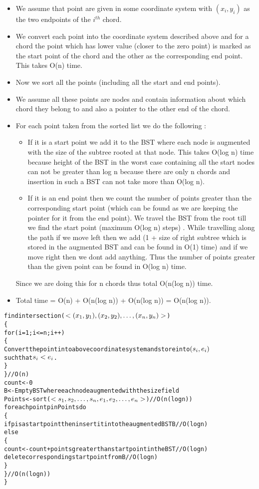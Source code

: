 \documentclass{article}
\begin{document}
\begin{itemize}
\item We assume that point are given in some coordinate system with $(x_i,y_i)$ as the two endpoints of the $i^{th}$ chord.
\item We convert each point into the coordinate system described above and for a chord the point which has lower value (closer to the zero point) is marked as the start point of the chord and the other as the corresponding end point.
This takes O(n) time.
\item Now we sort all the points (including all the start and end points).
\item We assume all these points are nodes and contain information about which chord they belong to and also a pointer to the other end of the chord. 
\item For each point taken from the sorted list we do the following :
	\begin{itemize}
	\item If it is a start point we add it to the BST where each node is augmented with the size of the subtree rooted at that node. This takes O(log n) time because height of the BST in the worst case containing all the start nodes can not be greater than log n because there are only n chords and insertion in such a BST can not take more than O(log n).
	\item If it is an end point then we count the number of points greater than the corresponding start point (which can be found as we are keeping the pointer for it from the end point). We travel the BST from the root till we find the start point (maximum O(log n) steps) . While travelling along the path if we move left then we add (1 + size of right subtree which is stored in the augmented BST and can be found in O(1) time) and if we move right then we dont add anything. Thus the number of points greater than the given point can be found in O(log n) time. 
	\end{itemize}
	Since we are doing this for n chords thus total O(n(log n)) time. 
\item Total time = O(n) + O(n(log n)) + O(n(log n)) = O(n(log n)).
\end{itemize}
\begin{alltt}
findintersection(\(<(x\sb1,y\sb1),(x\sb2,y\sb2),\ldots ,(x\sb{n},y\sb{n})>\)) 
\{ 
for (i=1;i<=n;i++)
    \{
        Convert the point into above coordinate system and store into \((s\sb{i},e\sb{i})\) 
        such that \(s\sb{i} < e\sb{i}\) .
    \}
\}                                                                           // O (n)
count <- 0 
B <- Empty BST where each node augmented with the size field
Points <- sort (\(<s\sb1,s\sb2,\ldots,s\sb{n},e\sb1,e\sb2,\ldots,e\sb{n}>\))                              //O(n(log n)) 
foreach point p in Points do 
    \{
    if p is a start point then insert it into the augmented BST B            // O(log n)
    else 
        \{  
            count <- count + points greater than start point in the BST      // O(log n)
            delete corresponding startpoint from B                           // O(log n)
        \}
    \}                                                                       // O(n(log n))
\}
\end{alltt}
	
\end{document}
